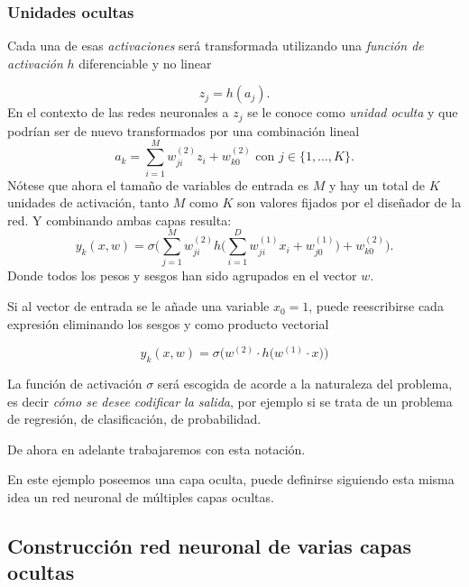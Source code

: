 \subsubsection*{Unidades ocultas}
Cada una de esas \textit{activaciones} será transformada
utilizando una \textit{función de activación} $h$ 
diferenciable y no linear

\begin{equation}
    z_j = h(a_j).
\end{equation}
En el contexto de las redes neuronales a $z_j$ se le conoce como \textit{unidad oculta} y que podrían ser de 
nuevo  transformados por una combinación lineal 
\begin{equation}
    a_k = \sum_{i=1}^M w_{ji}^{(2)} z_i + w_{k0}^{(2)}
    \text{ con } j \in \{1, \ldots, K \}.
\end{equation}
Nótese que ahora el tamaño de variables de entrada es $M$
y hay un total de $K$ unidades de activación, tanto $M$ como $K$ son
valores fijados por el diseñador de la red. 
Y combinando ambas capas resulta: 
\begin{equation}
    y_k(x,w) = \sigma 
    \biggl( 
        \sum^M_{j=1} w_{ji}^{(2)}
        h 
        \biggl(
            \sum_{i=1}^D w_{ji}^{(1)} x_i + w_{j0}^{(1)}
        \biggr)
        + w_{k0}^{(2)}
    \biggr) .
\end{equation}
Donde todos los pesos y sesgos han sido agrupados en el vector $w$. 

Si al vector de entrada se le añade una variable $x_0 = 1$, puede reescribirse cada expresión eliminando los sesgos y como producto vectorial

\begin{equation}
    y_k(x,w) = \sigma 
    \bigl(
         w^{(2)} \cdot
        h 
        \bigl(
             w^{(1)} \cdot x 
        \bigr)
    \bigr)
\end{equation}  

La función de activación $\sigma$ será escogida de acorde a la
naturaleza del problema, es decir \textit{cómo se desee codificar la salida}, por ejemplo si se trata de un problema de regresión, de clasificación, de probabilidad. 
 
De ahora en adelante trabajaremos con esta notación. 


En este ejemplo poseemos una capa oculta, 
puede definirse siguiendo esta misma idea
un red neuronal de múltiples capas ocultas. 

\subsection{Construcción red neuronal de varias capas ocultas} \label{rrnn:construcción_generalizada}


